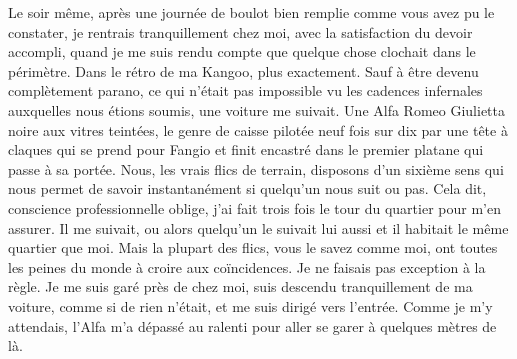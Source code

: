 \illusloflabel{}%
Le soir même, après une journée de boulot bien remplie comme vous avez pu le constater, je rentrais tranquillement chez moi, avec la satisfaction du devoir accompli, quand je me suis rendu compte que quelque chose clochait dans le périmètre. Dans le rétro de ma Kangoo, plus exactement. Sauf à être devenu complètement parano, ce qui n’était pas impossible vu les cadences infernales auxquelles nous étions soumis, une voiture me suivait. Une Alfa Romeo Giulietta noire aux vitres teintées, le genre de caisse pilotée neuf fois sur dix par une tête à claques qui se prend pour Fangio et finit encastré dans le premier platane qui passe à sa portée. Nous, les vrais flics de terrain, disposons d’un sixième sens qui nous permet de savoir instantanément si quelqu’un nous suit ou pas. Cela dit, conscience professionnelle oblige, j’ai fait trois fois le tour du quartier pour m’en assurer. Il me suivait, ou alors quelqu’un le suivait lui aussi et il habitait le même quartier que moi. Mais la plupart des flics, vous le savez comme moi, ont toutes les peines du monde à croire aux coïncidences. Je ne faisais pas exception à la règle. Je me suis garé près de chez moi, suis descendu tranquillement de ma voiture, comme si de rien n’était, et me suis dirigé vers l’entrée. Comme je m’y attendais, l’Alfa m’a dépassé au ralenti pour aller se garer à quelques mètres de là.

